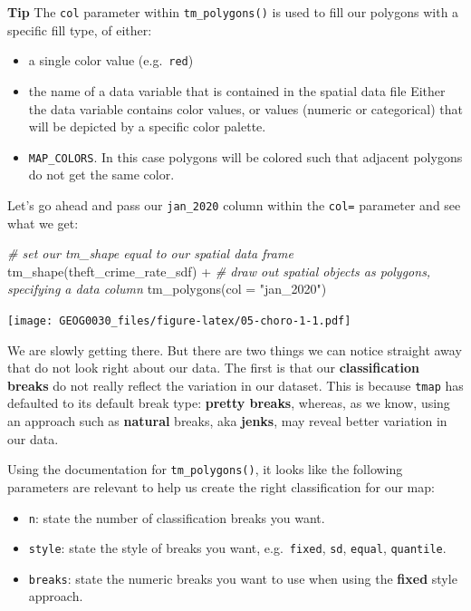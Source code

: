 \documentclass[
]{book}
\newenvironment{Shaded}{\begin{snugshade}}{\end{snugshade}}
\newcommand{\AttributeTok}[1]{\textcolor[rgb]{0.77,0.63,0.00}{#1}}
\newcommand{\CommentTok}[1]{\textcolor[rgb]{0.56,0.35,0.01}{\textit{#1}}}
\newcommand{\FunctionTok}[1]{\textcolor[rgb]{0.00,0.00,0.00}{#1}}
\newcommand{\NormalTok}[1]{#1}
\newcommand{\SpecialCharTok}[1]{\textcolor[rgb]{0.00,0.00,0.00}{#1}}
\newcommand{\StringTok}[1]{\textcolor[rgb]{0.31,0.60,0.02}{#1}}
\providecommand{\tightlist}{%
  \setlength{\itemsep}{0pt}\setlength{\parskip}{0pt}}
\begin{document}
\textbf{Tip}
The \texttt{col} parameter within \texttt{tm\_polygons()} is used to fill our polygons with a specific fill type, of either:

\begin{itemize}
\tightlist
\item
  a single color value (e.g.~\texttt{red})
\item
  the name of a data variable that is contained in the spatial data file Either the data variable contains color values, or values (numeric or categorical) that will be depicted by a specific color palette.
\item
  \texttt{MAP\_COLORS}. In this case polygons will be colored such that adjacent polygons do not get the same color.
\end{itemize}

Let's go ahead and pass our \texttt{jan\_2020} column within the \texttt{col=} parameter and see what we get:

\begin{Shaded}
\begin{Highlighting}[]
\CommentTok{\# set our tm\_shape equal to our spatial data frame}
\FunctionTok{tm\_shape}\NormalTok{(theft\_crime\_rate\_sdf) }\SpecialCharTok{+}
  \CommentTok{\# draw out spatial objects as polygons, specifying a data column}
  \FunctionTok{tm\_polygons}\NormalTok{(}\AttributeTok{col =} \StringTok{"jan\_2020"}\NormalTok{)}
\end{Highlighting}
\end{Shaded}

\texttt{[image: GEOG0030\_files/figure-latex/05-choro-1-1.pdf]}

We are slowly getting there. But there are two things we can notice straight away that do not look right about our data. The first is that our \textbf{classification breaks} do not really reflect the variation in our dataset. This is because \texttt{tmap} has defaulted to its default break type: \textbf{pretty breaks}, whereas, as we know, using an approach such as \textbf{natural} breaks, aka \textbf{jenks}, may reveal better variation in our data.

Using the documentation for \texttt{tm\_polygons()}, it looks like the following parameters are relevant to help us create the right classification for our map:

\begin{itemize}
\tightlist
\item
  \texttt{n}: state the number of classification breaks you want.
\item
  \texttt{style}: state the style of breaks you want, e.g.~\texttt{fixed}, \texttt{sd}, \texttt{equal}, \texttt{quantile}.
\item
  \texttt{breaks}: state the numeric breaks you want to use when using the \textbf{fixed} style approach.
\end{itemize}
\end{document}
